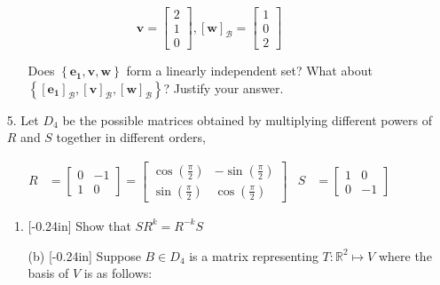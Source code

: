 \documentclass[letterpaper,12pt]{article}
\newcommand{\set}[1]{\left\{ #1 \right\}}
\theoremstyle{definition}
\begin{document}
$$\mathbf{v} = \begin{bmatrix}
    2 \\ 1 \\ 0
\end{bmatrix}, [\mathbf{w}]_\mathcal{B} = \begin{bmatrix}
    1 \\ 0 \\ 2
\end{bmatrix}$$
\begin{enumerate}
    \item[] \begin{enumerate}
        \item[] Does $\set{\mathbf{e_1},\mathbf{v},\mathbf{w}}$ form a linearly independent set? What about $\set{[\mathbf{e_1}]_\mathcal{B}, [\mathbf{v}]_\mathcal{B}, [\mathbf{w}]_\mathcal{B}}$? Justify your answer.
    \end{enumerate}
\end{enumerate}
\pagebreak
\begin{enumerate}
        \item[5.]  Let $D_4$ be the possible matrices obtained by multiplying different powers of $R$ and $S$ together in different orders,
\end{enumerate}
 \begin{align*}R &= \begin{bmatrix}
            0 & -1 \\ 1 & 0
        \end{bmatrix} = \begin{bmatrix}
            \cos \left (\frac{\pi}{2} \right ) & -\sin \left (\frac{\pi}{2} \right ) \\ \sin \left (\frac{\pi}{2} \right ) & \cos \left (\frac{\pi}{2} \right )
        \end{bmatrix} & S &= \begin{bmatrix}
            1 & 0 \\ 0 & -1
        \end{bmatrix}\end{align*}
\begin{enumerate}
    \item[] \begin{enumerate}
        \item\reversemarginpar{}[-0.24in] Show that $SR^k = R^{-k}S$
    \end{enumerate}
\end{enumerate}
\pagebreak
\begin{enumerate}
\item[] \begin{enumerate}
    \item[(b)]\reversemarginpar{}[-0.24in] Suppose $B \in D_4$ is a matrix representing $T: \mathbb{R}^2 \mapsto V$ where the basis of $V$ is as follows:
    \end{enumerate}
   \end{enumerate}
\end{document}
